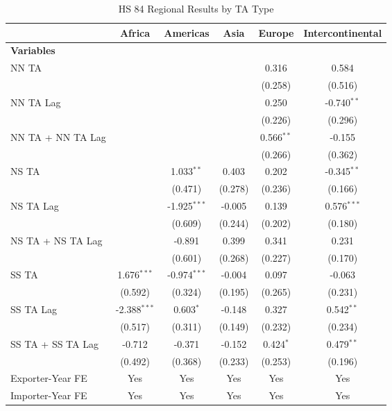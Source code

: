 \begin{table}[htbp]
    \centering
    \caption{HS 84 Regional Results by TA Type}
    \label{tab:84_pta_types}
    \begin{adjustbox}{max width=\textwidth}
    \begin{tabular}{lccccc}
    \hline
     & \multicolumn{1}{c}{Africa} & \multicolumn{1}{c}{Americas} & \multicolumn{1}{c}{Asia} & \multicolumn{1}{c}{Europe} & \multicolumn{1}{c}{Intercontinental} \\
    \hline
    \textbf{Variables} &  &  &  &  &  \\
    \hline
    NN TA &  &  &  & 0.316 & 0.584 \\
     &  &  &  & (0.258) & (0.516) \\
    NN TA Lag &  &  &  & 0.250 & -0.740$^{\ast\ast}$ \\
     &  &  &  & (0.226) & (0.296) \\
    NN TA + NN TA Lag &  &  &  & 0.566$^{\ast\ast}$ & -0.155 \\
     &  &  &  & (0.266) & (0.362) \\
    \hline
    NS TA &  & 1.033$^{\ast\ast}$ & 0.403 & 0.202 & -0.345$^{\ast\ast}$ \\
     &  & (0.471) & (0.278) & (0.236) & (0.166) \\
    NS TA Lag &  & -1.925$^{\ast\ast\ast}$ & -0.005 & 0.139 & 0.576$^{\ast\ast\ast}$ \\
     &  & (0.609) & (0.244) & (0.202) & (0.180) \\
    NS TA + NS TA Lag &  & -0.891 & 0.399 & 0.341 & 0.231 \\
     &  & (0.601) & (0.268) & (0.227) & (0.170) \\
    \hline
    SS TA & 1.676$^{\ast\ast\ast}$ & -0.974$^{\ast\ast\ast}$ & -0.004 & 0.097 & -0.063 \\
     & (0.592) & (0.324) & (0.195) & (0.265) & (0.231) \\
    SS TA Lag & -2.388$^{\ast\ast\ast}$ & 0.603$^{\ast}$ & -0.148 & 0.327 & 0.542$^{\ast\ast}$ \\
     & (0.517) & (0.311) & (0.149) & (0.232) & (0.234) \\
    SS TA + SS TA Lag & -0.712 & -0.371 & -0.152 & 0.424$^{\ast}$ & 0.479$^{\ast\ast}$ \\
     & (0.492) & (0.368) & (0.233) & (0.253) & (0.196) \\
    \hline
    Exporter-Year FE & Yes & Yes & Yes & Yes & Yes \\
    Importer-Year FE & Yes & Yes & Yes & Yes & Yes \\

\end{tabular}
\end{adjustbox}
\end{table}
